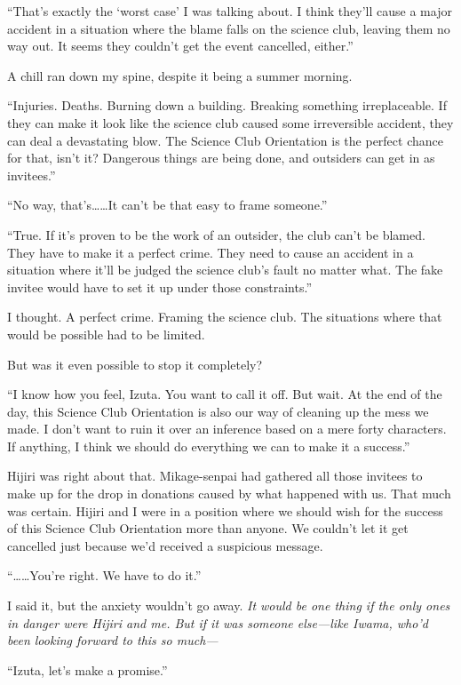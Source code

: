 \documentclass[
    a4paper,
    12pt,
    twoside,
    openany,
    UTF8,
    fontset=windows
]{ctexbook}
\begin{document}
``That's exactly the `worst case' I was talking about. I think they'll cause a major accident in a situation where the blame falls on the science club, leaving them no way out. It seems they couldn't get the event cancelled, either.''

A chill ran down my spine, despite it being a summer morning.

``Injuries. Deaths. Burning down a building. Breaking something irreplaceable. If they can make it look like the science club caused some irreversible accident, they can deal a devastating blow. The Science Club Orientation is the perfect chance for that, isn't it? Dangerous things are being done, and outsiders can get in as invitees.''

``No way, that's\dots\dots It can't be that easy to frame someone.''

``True. If it's proven to be the work of an outsider, the club can't be blamed. They have to make it a perfect crime. They need to cause an accident in a situation where it'll be judged the science club's fault no matter what. The fake invitee would have to set it up under those constraints.''

I thought. A perfect crime. Framing the science club. The situations where that would be possible had to be limited.

But was it even possible to stop it completely?

``I know how you feel, Izuta. You want to call it off. But wait. At the end of the day, this Science Club Orientation is also our way of cleaning up the mess we made. I don't want to ruin it over an inference based on a mere forty characters. If anything, I think we should do everything we can to make it a success.''

Hijiri was right about that. Mikage-senpai had gathered all those invitees to make up for the drop in donations caused by what happened with us. That much was certain. Hijiri and I were in a position where we should wish for the success of this Science Club Orientation more than anyone. We couldn't let it get cancelled just because we'd received a suspicious message.

``\dots\dots You're right. We have to do it.''

I said it, but the anxiety wouldn't go away. \textit{It would be one thing if the only ones in danger were Hijiri and me. But if it was someone else---like Iwama, who'd been looking forward to this so much---}

``Izuta, let's make a promise.''
\end{document}
